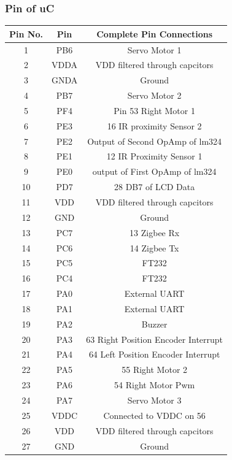 \documentclass[a4paper,10pt,oneside]{article}
\begin{document}
{		\subsubsection{\Large\textbf{Pin of uC}}
			\begin{longtable}{|c|c|c|}\hline
				Pin No.&Pin & 	Complete Pin Connections\\ \hline
				1 &		PB6	&	Servo Motor 1\\ \hline
				2 &		VDDA&	VDD filtered through capcitors\\ \hline
				3 &		GNDA&	Ground\\ \hline
				4 &		PB7 &	Servo Motor 2\\ \hline
				5 & 	PF4 &	Pin 53 Right Motor 1\\ \hline
				6 &		PE3	&	16 IR proximity Sensor 2\\ \hline
				7 &		PE2 &	Output of Second OpAmp of lm324\\ \hline
				8 &		PE1 &	12 IR Proximity Sensor 1 \\ \hline
				9 &		PE0 &	output of First OpAmp of lm324\\ \hline
				10 &	PD7 &	28 DB7 of LCD Data\\ \hline
				11 &	VDD &	VDD filtered through capcitors\\ \hline
				12 &	GND	 &	Ground\\ \hline
				13 &	PC7	 &	13 Zigbee Rx\\ \hline
				14 &	PC6	 &	14 Zigbee Tx\\ \hline
				15 & 	PC5	 &	FT232\\ \hline
				16 & 	PC4 &	FT232\\ \hline 
				17 &	PA0 &	External UART\\ \hline
				18 &	PA1 &	External UART\\ \hline
				19 &	PA2 &	Buzzer\\ \hline
				20 &	PA3 &	63 Right Position Encoder Interrupt\\ \hline
				21 &	PA4	 &	64 Left Position Encoder Interrupt\\ \hline
				22 &	PA5 &	55 Right Motor 2\\ \hline
				23 &	PA6 &	54 Right Motor Pwm\\ \hline
				24 &	PA7 &	Servo Motor 3\\ \hline
				25 &	VDDC &	Connected to VDDC on 56\\ \hline
				26 &	VDD	 &	VDD filtered through capcitors\\ \hline
				27 &	GND	 &	Ground\\ \hline

\end{longtable}}
\end{document}

